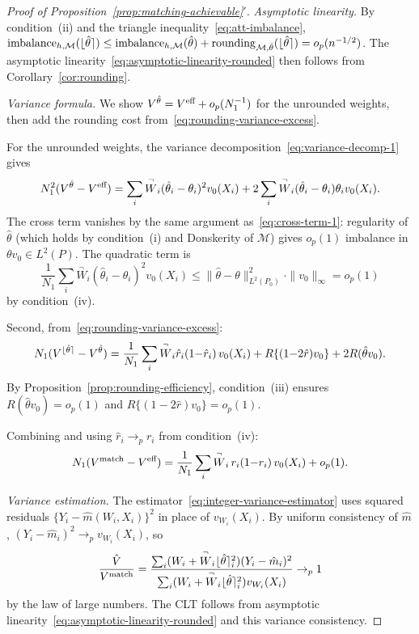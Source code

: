 \documentclass{article}
\newcommand{\paragraph}[1]{\par\noindent\textit{#1}\enspace}
\theoremstyle{definition}
\DeclarePairedDelimiter\round{\lfloor}{\rceil}
\DeclareMathOperator{\imbalance}{imbalance}
\DeclareMathOperator{\roundingerror}{rounding}
\newcommand{\model}{\mathcal{M}}
\newcommand{\<}{\langle}
\renewcommand{\>}{\rangle}
\begin{document}
\begin{refsection}
\begin{proof}[Proof of Proposition~\ref{prop:matching-achievable}$'$]
\paragraph{Asymptotic linearity.}
By condition~(ii) and the triangle inequality~\eqref{eq:att-imbalance}, $\imbalance_{h,\model}(\round{\hat\theta}) \le \imbalance_{h,\model}(\hat\theta) + \roundingerror_{\model,\hat\theta}(\round{\hat\theta}) = o_p(n^{-1/2})$. The asymptotic linearity~\eqref{eq:asymptotic-linearity-rounded} then follows from Corollary~\ref{cor:rounding}.

\paragraph{Variance formula.}
We show $V^{\hat\theta} = V^{\textup{eff}} + o_p(N_1^{-1})$ for the unrounded weights, then add the rounding cost from~\eqref{eq:rounding-variance-excess}.

For the unrounded weights, the variance decomposition~\eqref{eq:variance-decomp-1} gives
\[
N_1^2(V^{\hat\theta} - V^{\textup{eff}}) = \sum_i \overset{\neg}{W}_i(\hat\theta_i - \theta_i)^2 v_0(X_i) + 2\sum_i \overset{\neg}{W}_i(\hat\theta_i - \theta_i)\theta_i v_0(X_i).
\]
The cross term vanishes by the same argument as~\eqref{eq:cross-term-1}: regularity of $\hat\theta$ (which holds by condition~(i) and Donskerity of $\model$) gives $o_p(1)$ imbalance in $\theta v_0 \in L^2(P)$. The quadratic term is
\[
\frac{1}{N_1}\sum_i \overset{\neg}{W}_i(\hat\theta_i - \theta_i)^2 v_0(X_i) \le \|\hat\theta - \theta\|_{L^2(P_0)}^2 \cdot \|v_0\|_\infty = o_p(1)
\]
by condition~(iv).

Second, from~\eqref{eq:rounding-variance-excess}:
\[
N_1(V^{\round{\hat\theta}} - V^{\hat\theta}) = \frac{1}{N_1}\sum_i \overset{\neg}{W}_i\hat r_i(1{-}\hat r_i)\,v_0(X_i) + R\{(1{-}2\hat r)v_0\} + 2R(\hat\theta v_0).
\]
By Proposition~\ref{prop:rounding-efficiency}, condition~(iii) ensures $R(\hat\theta v_0) = o_p(1)$ and $R\{(1{-}2\hat r)v_0\} = o_p(1)$.

Combining and using $\hat r_i \to_p r_i$ from condition~(iv):
\[
N_1(V^{\textup{match}} - V^{\textup{eff}}) = \frac{1}{N_1}\sum_i \overset{\neg}{W}_i\,r_i(1{-}r_i)\,v_0(X_i) + o_p(1).
\]

\paragraph{Variance estimation.}
The estimator~\eqref{eq:integer-variance-estimator} uses squared residuals $\{Y_i - \hat m(W_i,X_i)\}^2$ in place of $v_{W_i}(X_i)$. By uniform consistency of $\hat m$, $(Y_i - \hat m_i)^2 \to_p v_{W_i}(X_i)$, so
\[
\frac{\hat V}{V^{\textup{match}}} = \frac{\sum_i (W_i + \overset{\neg}{W}_i\round{\hat\theta}_i^2)(Y_i - \hat m_i)^2}{\sum_i (W_i + \overset{\neg}{W}_i\round{\hat\theta}_i^2) v_{W_i}(X_i)} \to_p 1
\]
by the law of large numbers. The CLT follows from asymptotic linearity~\eqref{eq:asymptotic-linearity-rounded} and this variance consistency.
\end{proof}


\end{refsection}
\end{document}
